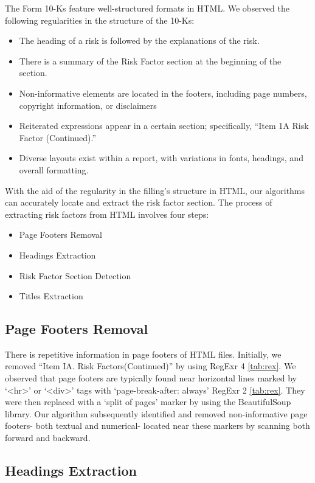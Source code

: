 \documentclass[logo,bsc,singlespacing,parskip]{infthesis}
\begin{document}
The Form 10-Ks feature well-structured formats in HTML. We observed the following regularities in the structure of the 10-Ks:
\begin{itemize}
    \item The heading of a risk is followed by the explanations of the risk.
    \item There is a summary of the Risk Factor section at the beginning of the section.
    \item Non-informative elements are located in the footers, including page numbers, copyright information, or disclaimers
    \item Reiterated expressions appear in a certain section; specifically, “Item 1A Risk Factor (Continued).”
    \item Diverse layouts exist within a report, with variations in fonts, headings, and overall formatting.

\end{itemize}
With the aid of the regularity in the filling’s structure in HTML, our algorithms can accurately locate and extract the risk factor section. The process of extracting risk factors from HTML involves four steps: 
\begin{itemize}
    \item Page Footers Removal
    \item Headings Extraction
    \item Risk Factor Section Detection
    \item Titles Extraction
\end{itemize}

\subsection{Page Footers Removal}

There is repetitive information in page footers of HTML files. Initially, we removed “Item IA. Risk Factors(Continued)” by using RegExr 4 \ref{tab:rex}. We observed that page footers are typically found near horizontal lines marked by ‘\textless hr\textgreater’ or ‘\textless div\textgreater’ tags with ‘page-break-after: always’ RegExr 2 \ref{tab:rex}. They were then replaced with a ‘split of pages’ marker by using the BeautifulSoup library. Our algorithm subsequently identified and removed non-informative page footers- both textual and numerical- located near these markers by scanning both forward and backward. 

\subsection{Headings Extraction}
\end{document}
